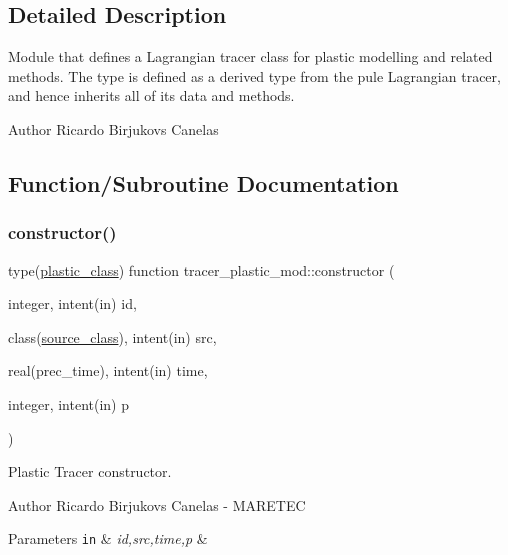 \subsection{Detailed Description}
Module that defines a Lagrangian tracer class for plastic modelling and related methods. The type is defined as a derived type from the pule Lagrangian tracer, and hence inherits all of it\textquotesingle{}s data and methods. 

\begin{DoxyAuthor}{Author}
Ricardo Birjukovs Canelas 
\end{DoxyAuthor}


\subsection{Function/\+Subroutine Documentation}
\mbox{\label{namespacetracer__plastic__mod_a04049a86055ae0f3f4e26ae51761a5a2}} 
\subsubsection{\texorpdfstring{constructor()}{constructor()}}
{\footnotesize\ttfamily type(\mbox{\hyperlink{structtracer__plastic__mod_1_1plastic__class}{plastic\+\_\+class}}) function tracer\+\_\+plastic\+\_\+mod\+::constructor (\begin{DoxyParamCaption}\item[{integer, intent(in)}]{id,  }\item[{class(\mbox{\hyperlink{structsources__mod_1_1source__class}{source\+\_\+class}}), intent(in)}]{src,  }\item[{real(prec\+\_\+time), intent(in)}]{time,  }\item[{integer, intent(in)}]{p }\end{DoxyParamCaption})\hspace{0.3cm}{\ttfamily [private]}}



Plastic Tracer constructor. 

\begin{DoxyAuthor}{Author}
Ricardo Birjukovs Canelas -\/ M\+A\+R\+E\+T\+EC 
\end{DoxyAuthor}

\begin{DoxyParams}[1]{Parameters}
\mbox{\tt in}  & {\em id,src,time,p} & \\
\hline
\end{DoxyParams}


